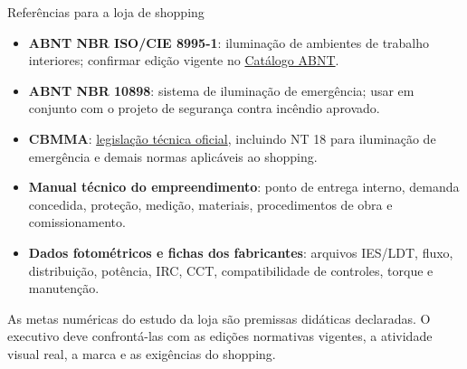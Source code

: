 \begin{frame}{Referências para a loja de shopping}
\small
\begin{itemize}
\item \textbf{ABNT NBR ISO/CIE 8995-1}: iluminação de ambientes de trabalho interiores; confirmar edição vigente no \href{https://www.abntcatalogo.com.br/}{Catálogo ABNT}.
\item \textbf{ABNT NBR 10898}: sistema de iluminação de emergência; usar em conjunto com o projeto de segurança contra incêndio aprovado.
\item \textbf{CBMMA}: \href{https://cbm.ssp.ma.gov.br/unidades-bm/unidades-administrativas/dat/legislacao-tecnica-dat/}{legislação técnica oficial}, incluindo NT 18 para iluminação de emergência e demais normas aplicáveis ao shopping.
\item \textbf{Manual técnico do empreendimento}: ponto de entrega interno, demanda concedida, proteção, medição, materiais, procedimentos de obra e comissionamento.
\item \textbf{Dados fotométricos e fichas dos fabricantes}: arquivos IES/LDT, fluxo, distribuição, potência, IRC, CCT, compatibilidade de controles, torque e manutenção.
\end{itemize}
\begin{caixaAt}
As metas numéricas do estudo da loja são premissas didáticas declaradas. O executivo deve confrontá-las com as edições normativas vigentes, a atividade visual real, a marca e as exigências do shopping.
\end{caixaAt}
\end{frame}
